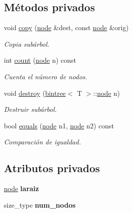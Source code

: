 \subsection*{Métodos privados}
\begin{DoxyCompactItemize}
\item 
void \hyperlink{classbintree_ae96f1d4033e009d56cc956e1b05d4208}{copy} (\hyperlink{classbintree_1_1node}{node} \&dest, const \hyperlink{classbintree_1_1node}{node} \&orig)
\begin{DoxyCompactList}\small\item\em Copia subárbol. \end{DoxyCompactList}\item 
int \hyperlink{classbintree_a67dfc885afb58a86b3356c5b897e98d2}{count} (\hyperlink{classbintree_1_1node}{node} n) const 
\begin{DoxyCompactList}\small\item\em Cuenta el número de nodos. \end{DoxyCompactList}\item 
void \hyperlink{classbintree_a592b7a2273dcdefbf5ca012eba85b84a}{destroy} (\hyperlink{classbintree}{bintree}$<$ T $>$\+::\hyperlink{classbintree_1_1node}{node} n)
\begin{DoxyCompactList}\small\item\em Destruir subárbol. \end{DoxyCompactList}\item 
bool \hyperlink{classbintree_a6a7491790f1fe7b107283182e02b68bc}{equals} (\hyperlink{classbintree_1_1node}{node} n1, \hyperlink{classbintree_1_1node}{node} n2) const 
\begin{DoxyCompactList}\small\item\em Comparación de igualdad. \end{DoxyCompactList}\end{DoxyCompactItemize}
\subsection*{Atributos privados}
\begin{DoxyCompactItemize}
\item 
\hypertarget{classbintree_adab116fab73fb325c2d36abe26fae1fd}{}\hyperlink{classbintree_1_1node}{node} {\bfseries laraiz}\label{classbintree_adab116fab73fb325c2d36abe26fae1fd}

\item 
\hypertarget{classbintree_aeb6f12c34ae26dacc79bcee2a3ba7353}{}size\+\_\+type {\bfseries num\+\_\+nodos}\label{classbintree_aeb6f12c34ae26dacc79bcee2a3ba7353}

\end{DoxyCompactItemize}


